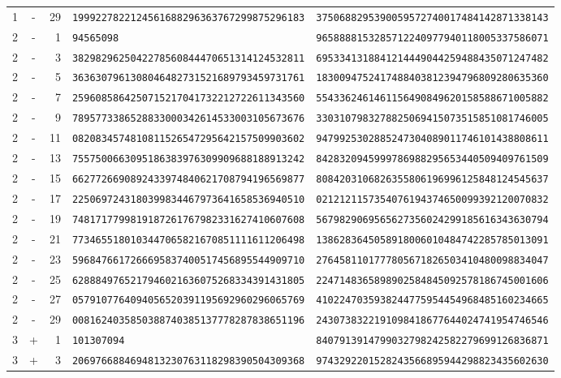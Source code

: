 \begin{longtable}{@{}rcrll@{}}
1&-&29&\texttt{1999227822124561688296363767299875296183}&\texttt{3750688295390059572740017484142871338143}\\
2&-&1&\texttt{94565098}&\texttt{9658888153285712240977940118005337586071}\\
2&-&3&\texttt{3829829625042278560844470651314124532811}&\texttt{6953341318841214449044259488435071247482}\\
2&-&5&\texttt{3636307961308046482731521689793459731761}&\texttt{1830094752417488403812394796809280635360}\\
2&-&7&\texttt{2596085864250715217041732212722611343560}&\texttt{5543362461461156490849620158588671005882}\\
2&-&9&\texttt{7895773386528833000342614533003105673676}&\texttt{3303107983278825069415073515851081746005}\\
2&-&11&\texttt{0820834574810811526547295642157509903602}&\texttt{9479925302885247304089011746101438808611}\\
2&-&13&\texttt{7557500663095186383976309909688188913242}&\texttt{8428320945999786988295653440509409761509}\\
2&-&15&\texttt{6627726690892433974840621708794196569877}&\texttt{8084203106826355806196996125848124545637}\\
2&-&17&\texttt{2250697243180399834467973641658536940510}&\texttt{0212121157354076194374650099392120070832}\\
2&-&19&\texttt{7481717799819187261767982331627410607608}&\texttt{5679829069565627356024299185616343630794}\\
2&-&21&\texttt{7734655180103447065821670851111611206498}&\texttt{1386283645058918006010484742285785013091}\\
2&-&23&\texttt{5968476617266695837400517456895544909710}&\texttt{2764581101777805671826503410480098834047}\\
2&-&25&\texttt{6288849765217946021636075268334391431805}&\texttt{2247148365898902584845092578186745001606}\\
2&-&27&\texttt{0579107764094056520391195692960296065769}&\texttt{4102247035938244775954454968485160234665}\\
2&-&29&\texttt{0081624035850388740385137778287838651196}&\texttt{2430738322191098418677644024741954746546}\\
3&+&1&\texttt{101307094}&\texttt{8407913914799032798242582279699126836871}\\
3&+&3&\texttt{2069766884694813230763118298390504309368}&\texttt{9743292201528243566895944298823435602630}\\

\end{longtable}
